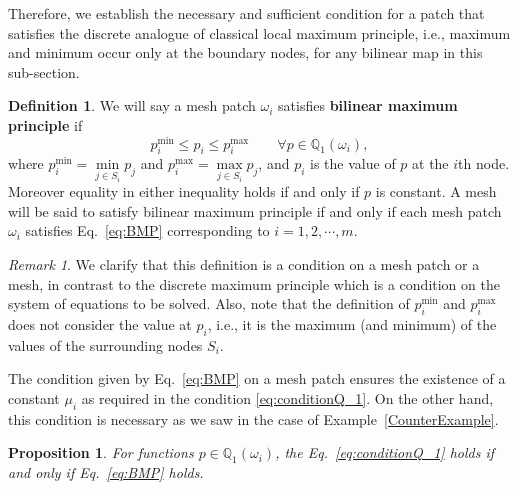 \documentclass[a4paper]{article}
\theoremstyle{plain}
\newtheorem{proposition}[lemma]{Proposition}
\theoremstyle{definition}
\newtheorem{definition}[lemma]{Definition}
\theoremstyle{remark}
\newtheorem{remark}[lemma]{Remark}
\begin{document}
Therefore, we establish the necessary and sufficient condition for a patch that satisfies the discrete analogue of classical local maximum principle,  i.e., maximum and minimum occur only at the boundary nodes, for any bilinear map in this sub-section.
 
\begin{definition}
We will say a mesh patch $\omega_i$ satisfies \textbf{bilinear maximum principle} if 
\begin{equation}
p_i^{\min} \leq p_i \leq p_i^{\max} \qquad \forall p \in \mathbb{Q}_1(\omega_i), \label{eq:BMP}
\end{equation}
where $p_i^{\min} = \min\limits_{j \in S_i} p_j$ and $p_i^{\max}=\max\limits_{j \in S_i} p_j$, and $p_i$ is the value of $p$ at the $i$th node. Moreover equality in either inequality holds if and only if $p$ is constant.  A mesh will be said to satisfy bilinear maximum principle if and only if each mesh patch $\omega_i$ satisfies Eq.~\eqref{eq:BMP} corresponding to $i=1,2,\cdots,m$.	\label{Def:BilMax}
 \end{definition}
 
 \begin{remark}
	We clarify that this definition is a condition on a mesh patch or a mesh, in contrast to the discrete maximum principle which is a condition on the system of equations to be solved. Also, note that the definition of $p^{\min}_i$ and $p^{\max}_i$ does not consider the value at $p_i$, i.e., it is the maximum (and minimum) of the values of the surrounding nodes $S_i$. 
\end{remark}
The condition given by Eq.~\eqref{eq:BMP} on a mesh patch ensures the existence of a constant $\mu_i$ as required in the condition \eqref{eq:conditionQ_1}. On the other hand, this condition is necessary as we saw in the case of Example~\ref{CounterExample}.

\begin{proposition}\label{Prop:Existence}
For functions $p \in \mathbb{Q}_1(\omega_i) $, the Eq.~\eqref{eq:conditionQ_1} holds if and only if Eq.~\eqref{eq:BMP} holds.
\end{proposition}
\end{document}
